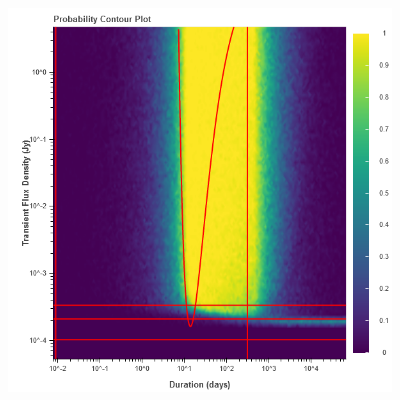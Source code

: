 \documentclass{article}
\begin{document}
\begin{figure}[H] 
	\begin{center}
		\includegraphics[width=4in]{output_halfgaussian1_ProbContour.png}
		
		\label{halfgaussian1}
	\end{center}
\end{figure}
\end{document}
